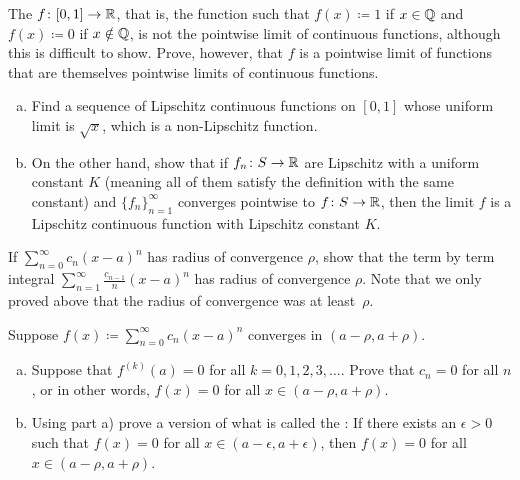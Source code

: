 \begin{exercise}[Challenging]
The 
$f \colon [0,1] \to {\mathbb{R}}$, that is, the
function such that $f(x) \coloneqq 1$ if $x \in {\mathbb{Q}}$
and $f(x) \coloneqq 0$ if $x \notin {\mathbb{Q}}$,
is not the pointwise limit of
continuous functions, although this is difficult to show.
Prove, however, that $f$ is a pointwise limit of functions that are themselves
pointwise limits of
continuous functions.
\end{exercise}

\begin{exercise}
\leavevmode
\begin{enumerate}[a)]
\item
Find a sequence of Lipschitz continuous functions on $[0,1]$
whose uniform limit is $\sqrt{x}$, which is a non-Lipschitz function.
\item
On the other hand, show that if $f_n \colon S \to {\mathbb{R}}$ are Lipschitz
with a uniform constant $K$ (meaning all of them satisfy the definition
with the same constant) and $\{ f_n \}_{n=1}^\infty$ converges pointwise
to $f \colon S \to {\mathbb{R}}$,
then the limit $f$ is a Lipschitz continuous function
with Lipschitz constant $K$.
\end{enumerate}
\end{exercise}

\begin{exercise}
If $\sum_{n=0}^\infty c_n {(x-a)}^n$ has radius of convergence $\rho$,
show that the term by term integral
$\sum_{n=1}^\infty \frac{c_{n-1}}{n} {(x-a)}^n$ has radius of convergence
$\rho$.  Note that we only proved above that the radius of convergence was
at least~$\rho$.
\end{exercise}

\begin{exercise}
\pagebreak[3]
Suppose $f(x) \coloneqq \sum_{n=0}^\infty c_n {(x-a)}^n$ converges in $(a-\rho,a+\rho)$.
\begin{enumerate}[a)]
\item
Suppose that $f^{(k)}(a) = 0$ for all $k=0,1,2,3,\ldots$.  Prove that
$c_n = 0$ for all $n$, or in other words, 
$f(x) = 0$ for all $x \in (a-\rho,a+\rho)$.
\item
Using part a) prove a version of what is called the
:  If there exists an $\epsilon > 0$
such that $f(x) = 0$ for all $x \in (a-\epsilon, a+\epsilon)$, then
$f(x) = 0$ for all $x \in (a-\rho,a+\rho)$.
\end{enumerate}
\end{exercise}

